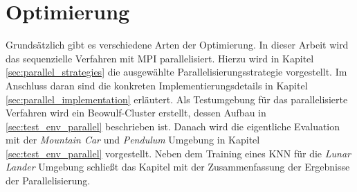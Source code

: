 \chapter{Optimierung}
\label{chap:optimization}
Grundsätzlich gibt es verschiedene Arten der Optimierung. In dieser Arbeit wird das sequenzielle Verfahren mit \ac{MPI} parallelisiert. Hierzu wird in Kapitel \ref{sec:parallel_strategies} die ausgewählte Parallelisierungsstrategie vorgestellt. Im Anschluss daran sind die konkreten Implementierungsdetails in Kapitel \ref{sec:parallel_implementation} erläutert. Als Testumgebung für das parallelisierte Verfahren wird ein Beowulf-Cluster erstellt, dessen Aufbau in \ref{sec:test_env_parallel} beschrieben ist. Danach wird die eigentliche Evaluation mit der \emph{Mountain Car} und \emph{Pendulum} Umgebung in Kapitel \ref{sec:test_env_parallel} vorgestellt. Neben dem Training eines \ac{KNN} für die \emph{Lunar Lander} Umgebung schließt das Kapitel mit der Zusammenfassung der Ergebnisse der Parallelisierung.








